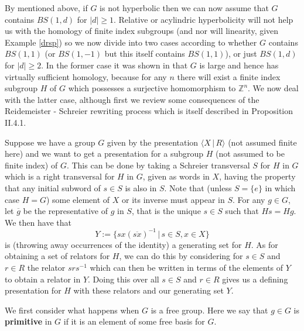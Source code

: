 \documentclass[11pt,reqno]{amsart}
\numberwithin{equation}{section}
\newcommand{\Z}{\mathbb{Z}}
\newcommand{\geqs}{\geqslant}
\theoremstyle{definition}
\theoremstyle{remark}
\begin{document}
By \cite{mut} mentioned above, if $G$ is not hyperbolic then
we can now assume that $G$ contains $BS(1,d)$
for $|d|\geq 1$. Relative or acylindric hyperbolicity will not help us
with the homology of finite index subgroups (and nor will linearity,
given Example \ref{drsp}) so we now divide into
two cases according to whether $G$ contains $BS(1,1)$
(or $BS(1,-1)$ but this itself contains $BS(1,1)$),
or just $BS(1,d)$
for $|d|\geqs 2$. In the former case it was shown in \cite{med1} that
$G$ is large and hence has virtually sufficient homology, because for
any $n$ there will exist a finite index subgroup $H$ of $G$ which
possesses a surjective homomorphism to $\Z^n$. We now deal with the latter
case, although first we review some consequences of the 
Reidemeister - Schreier rewriting process which is itself described
in \cite{ls} Proposition II.4.1.

Suppose we have a group $G$
given by the presentation $\langle X\,|\,R\rangle$
(not assumed finite here) and we want to get a presentation for a subgroup
$H$ (not assumed to be finite index)
of $G$. This can be done by taking
a Schreier transversal $S$ for $H$ in $G$ which
is a right transversal for $H$ in $G$, given as words in $X$,
having the property that any initial subword of $s\in S$
is also in $S$. Note that (unless $S=\{e\}$ in which case $H=G$) some element
of $X$ or its inverse must appear in $S$. For any $g\in G$, let $\overline{g}$ 
be the representative of $g$ in $S$, that is the unique $s\in S$ such that
$Hs=Hg$. We then have that
\[Y:=\{sx(\overline{sx})^{-1}\,|\,s\in S,x\in X\}\]
is (throwing away occurrences of the identity) a generating set
for $H$. As for obtaining a set of relators for $H$,
we can do this by considering for $s\in S$ and $r\in R$ the relator
$srs^{-1}$ which can then be
written in terms of the elements of $Y$ to obtain a relator
in $Y$. Doing this over all $s\in S$ and $r\in R$ gives us a defining
presentation for $H$ with these relators and our generating set $Y$.

We first consider what happens when $G$ is a free group. Here
we say that $g\in G$ is {\bf primitive} in $G$ if it is an element of some
free basis for $G$.
\end{document}
